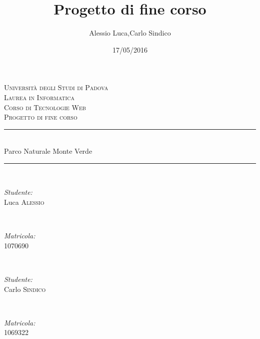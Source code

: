 \documentclass[12pt]{article}
\title{Progetto di fine corso}
\date{17/05/2016}
\author{Alessio Luca,Carlo Sindico}
\begin{document}
	
	\begin{titlepage}
		\newcommand{\HRule}{\rule{\linewidth}{0.5mm}}%
		\center
		
		\textsc{\LARGE Universit\`a degli Studi di Padova}\\[1.5cm] 
		\textsc{\Large Laurea in Informatica}\\[0.5cm]
		\textsc{\large Corso di Tecnologie Web}\\[0.5cm]
		\textsc{\large Progetto di fine corso}\\[0.5cm]
		
		
		\HRule \\[0.4cm]
		{ \huge  Parco Naturale Monte Verde}\\[0.3cm] 
		\HRule \\[0.4cm]
		
		
		
		\begin{minipage}{0.3\textwidth}
			\begin{flushleft} \large
				\emph{Studente:}\\
				Luca \textsc{Alessio} %
			\end{flushleft}
		\end{minipage}
		~
		\begin{minipage}{0.3\textwidth}
			\begin{flushright} \large
				\emph{Matricola:} \\
				\textsc{1070690} %
			\end{flushright}
		\end{minipage}\\[1cm]
		
			\begin{minipage}{0.3\textwidth}
				\begin{flushleft} \large
					\emph{Studente:}\\
					Carlo \textsc{Sindico} %
				\end{flushleft}
			\end{minipage}
			~
			\begin{minipage}{0.3\textwidth}
				\begin{flushright} \large
					\emph{Matricola:} \\
					\textsc{1069322} %
				\end{flushright}
			\end{minipage}\\[1cm]
			

\end{titlepage}
\end{document}
